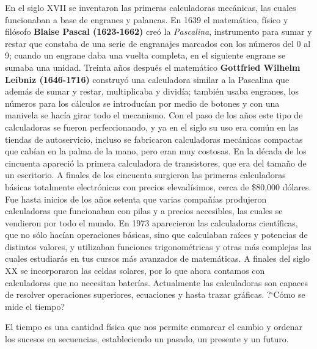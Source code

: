 \documentclass[11pt]{book}
\begin{document}
En el siglo XVII se inventaron las primeras calculadoras mec\'anicas, las cuales
funcionaban a base de engranes y palancas.
En 1639 el matem\'atico, f\'isico y fil\'osofo \textbf{Blaise Pascal (1623-1662)}
cre\'o la \emph{Pascalina}, instrumento para sumar y
restar que constaba de una serie de engranajes marcados con los n\'umeros del 0
al 9; cuando un engrane daba una vuelta completa,
en el siguiente engrane se sumaba una unidad.
Treinta años despu\'es el matem\'atico \textbf{Gottfried Wilhelm Leibniz
  (1646-1716)} construy\'o una calculadora similar a la
Pascalina que adem\'as de sumar y restar, multiplicaba y divid\'ia; tambi\'en usaba
engranes, los n\'umeros para los c\'alculos se
introduc\'ian por medio de botones y con una manivela se hac\'ia girar todo el
mecanismo.
Con el paso de los años este tipo de calculadoras se fueron perfeccionando, y
ya en el siglo su uso era com\'un en las tiendas
de autoservicio, incluso se fabricaron calculadoras mec\'anicas compactas que
cab\'ian en la palma de la mano, pero eran muy
costosas. En la d\'ecada de los cincuenta apareci\'o la primera calculadora de
transistores, que era del tamaño de un escritorio.
A finales de los cincuenta surgieron las primeras calculadoras b\'asicas
totalmente electr\'onicas con precios elevad\'isimos,
cerca de \$80,000 d\'olares. Fue hasta inicios de los años setenta que varias
compañ\'ias produjeron calculadoras que funcionaban
con pilas y a precios accesibles, las cuales se vendieron por todo el mundo. En
1973 aparecieron las calculadoras cient\'ificas,
que no s\'olo hac\'ian operaciones b\'asicas, sino que calculaban ra\'ices y potencias
de distintos valores, y utilizaban funciones
trigonom\'etricas y otras m\'as complejas las cuales estudiar\'as en tus cursos m\'as
avanzados de matem\'aticas. A finales del siglo XX
se incorporaron las celdas solares, por lo que ahora contamos con calculadoras
que no necesitan bater\'ias. Actualmente las
calculadoras son capaces de resolver operaciones superiores, ecuaciones y hasta
trazar gr\'aficas.
?`C\'omo se mide el tiempo?

El tiempo es una cantidad f\'isica que nos permite enmarcar el cambio y ordenar
los sucesos en secuencias, estableciendo un pasado,
un presente y un futuro.
\end{document}
